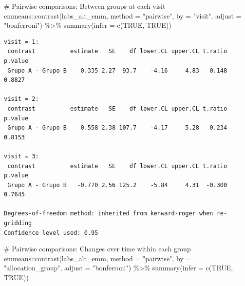 \documentclass[
  letterpaper,
  DIV=11,
  numbers=noendperiod]{scrartcl}
\newenvironment{Shaded}{\begin{snugshade}}{\end{snugshade}}
\newcommand{\AttributeTok}[1]{\textcolor[rgb]{0.40,0.45,0.13}{#1}}
\newcommand{\CommentTok}[1]{\textcolor[rgb]{0.37,0.37,0.37}{#1}}
\newcommand{\ConstantTok}[1]{\textcolor[rgb]{0.56,0.35,0.01}{#1}}
\newcommand{\FunctionTok}[1]{\textcolor[rgb]{0.28,0.35,0.67}{#1}}
\newcommand{\NormalTok}[1]{\textcolor[rgb]{0.00,0.23,0.31}{#1}}
\newcommand{\SpecialCharTok}[1]{\textcolor[rgb]{0.37,0.37,0.37}{#1}}
\newcommand{\StringTok}[1]{\textcolor[rgb]{0.13,0.47,0.30}{#1}}
\begin{document}
\begin{Shaded}
\begin{Highlighting}[]
\CommentTok{\# Pairwise comparisons: Between groups at each visit}
\NormalTok{emmeans}\SpecialCharTok{::}\FunctionTok{contrast}\NormalTok{(labs\_alt\_emm, }\AttributeTok{method =} \StringTok{"pairwise"}\NormalTok{, }\AttributeTok{by =} \StringTok{"visit"}\NormalTok{, }\AttributeTok{adjust =} \StringTok{"bonferroni"}\NormalTok{) }\SpecialCharTok{\%\textgreater{}\%} \FunctionTok{summary}\NormalTok{(}\AttributeTok{infer =} \FunctionTok{c}\NormalTok{(}\ConstantTok{TRUE}\NormalTok{, }\ConstantTok{TRUE}\NormalTok{))}
\end{Highlighting}
\end{Shaded}

\begin{verbatim}
visit = 1:
 contrast          estimate   SE    df lower.CL upper.CL t.ratio p.value
 Grupo A - Grupo B    0.335 2.27  93.7    -4.16     4.83   0.148  0.8827

visit = 2:
 contrast          estimate   SE    df lower.CL upper.CL t.ratio p.value
 Grupo A - Grupo B    0.558 2.38 107.7    -4.17     5.28   0.234  0.8153

visit = 3:
 contrast          estimate   SE    df lower.CL upper.CL t.ratio p.value
 Grupo A - Grupo B   -0.770 2.56 125.2    -5.84     4.31  -0.300  0.7645

Degrees-of-freedom method: inherited from kenward-roger when re-gridding 
Confidence level used: 0.95 
\end{verbatim}

\begin{Shaded}
\begin{Highlighting}[]
\CommentTok{\# Pairwise comparisons: Changes over time within each group}
\NormalTok{emmeans}\SpecialCharTok{::}\FunctionTok{contrast}\NormalTok{(labs\_alt\_emm, }\AttributeTok{method =} \StringTok{"pairwise"}\NormalTok{, }\AttributeTok{by =} \StringTok{"allocation\_group"}\NormalTok{, }\AttributeTok{adjust =} \StringTok{"bonferroni"}\NormalTok{) }\SpecialCharTok{\%\textgreater{}\%} \FunctionTok{summary}\NormalTok{(}\AttributeTok{infer =} \FunctionTok{c}\NormalTok{(}\ConstantTok{TRUE}\NormalTok{, }\ConstantTok{TRUE}\NormalTok{))}
\end{Highlighting}
\end{Shaded}
\end{document}
